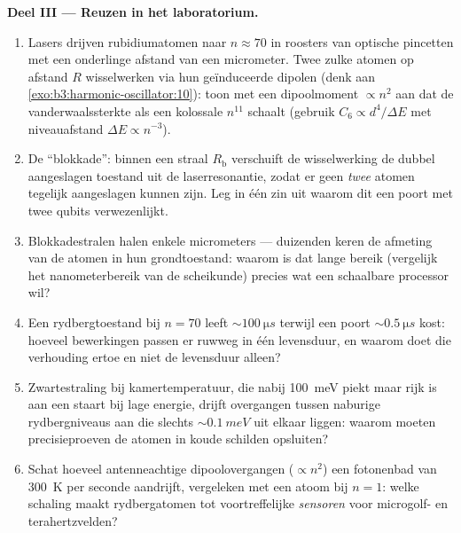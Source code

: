 \begin{problem}
\medskip\noindent\textbf{Deel III --- Reuzen in het laboratorium.}
\begin{enumerate}[resume]
  \item Lasers drijven rubidiumatomen naar $n \approx 70$ in roosters van
        optische pincetten met een onderlinge afstand van een micrometer.
        Twee zulke atomen op afstand $R$ wisselwerken via hun
        geïnduceerde dipolen (denk aan
        \cref{exo:b3:harmonic-oscillator:10}): toon met een dipoolmoment
        $\propto n^2$ aan dat de vanderwaalssterkte als een kolossale
        $n^{11}$ schaalt (gebruik $C_6 \propto d^4/\Delta E$ met
        niveauafstand $\Delta E \propto n^{-3}$).
  \item De ``blokkade'': binnen een straal $R_{\text{b}}$ verschuift de
        wisselwerking de dubbel aangeslagen toestand uit de laserresonantie,
        zodat er geen \emph{twee} atomen tegelijk aangeslagen kunnen zijn.
        Leg in één zin uit waarom dit een poort met twee qubits
        verwezenlijkt.
  \item Blokkadestralen halen enkele micrometers --- duizenden keren de
        afmeting van de atomen in hun grondtoestand: waarom is dat lange
        bereik (vergelijk het nanometerbereik van de scheikunde) precies
        wat een schaalbare processor wil?
  \item Een rydbergtoestand bij $n = 70$ leeft $\sim\qty{100}{\micro s}$
        terwijl een poort $\sim\qty{0.5}{\micro s}$ kost: hoeveel
        bewerkingen passen er ruwweg in één levensduur, en waarom doet
        die verhouding ertoe en niet de levensduur alleen?
  \item Zwartestraling bij kamertemperatuur, die nabij \qty{100}{meV}
        piekt maar rijk is aan een staart bij lage energie, drijft
        overgangen tussen naburige rydbergniveaus aan die slechts
        $\sim\qty{0.1}{meV}$ uit elkaar liggen: waarom moeten
        precisieproeven de atomen in koude schilden opsluiten?
  \item Schat hoeveel antenneachtige dipoolovergangen ($\propto n^2$) een
        fotonenbad van \qty{300}{K} per seconde aandrijft, vergeleken met
        een atoom bij $n = 1$: welke schaling maakt rydbergatomen tot
        voortreffelijke \emph{sensoren} voor microgolf- en
        terahertzvelden?
\end{enumerate}


\end{problem}
